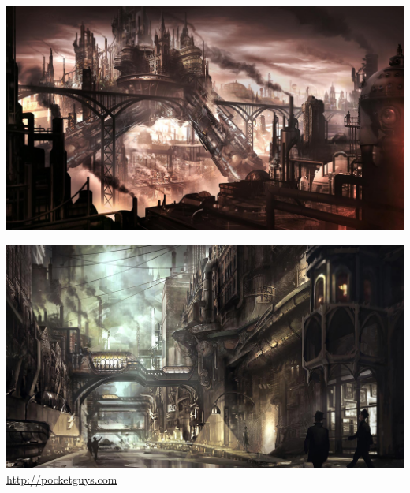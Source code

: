 \begin{minipage}{.49\textwidth}
\includegraphics[width=\linewidth]{./images/Annexes/concept_001.jpg}
\\[-1mm]
\end{minipage}
\hspace{.02\textwidth}
\begin{minipage}{.49\textwidth}
\includegraphics[width=\linewidth]{./images/Annexes/slide-04.jpg}
\\[-1mm]
\url{http://pocketguys.com}
\end{minipage}

